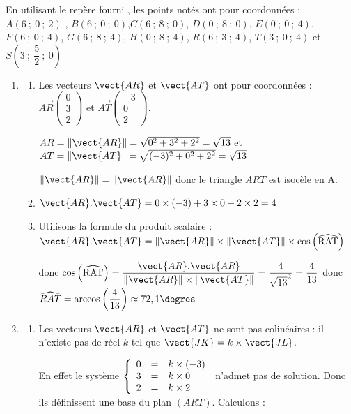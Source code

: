 \medskip
En utilisant le repère fourni \Oijk, les points notés ont pour coordonnées : 
$A\left(6~;~0~;~2\right)$ , $B\left(6~;~0~;~0\right)$,$C\left(6~;~8~;~0\right)$, $D\left(0~;~8~;~0\right)$, $E\left(0~;~0~;~4\right)$, $F\left(6~;~0~;~4\right)$, $G\left(6~;~8~;~4\right)$, $H\left(0~;~8~;~4\right)$, $R\left(6~;~3~;~4\right)$, $T\left(3~;~0~;~4\right)$ et $S\left(3~;~\dfrac52~;~0\right)$

\begin{enumerate}
	\item 
	\begin{enumerate}
		\item Les vecteurs $\vect{AR}$ et $\vect{AT}$ ont pour coordonnées : \(\overrightarrow{AR}\begin{pmatrix}0\\3\\2\end{pmatrix}\) et \(\overrightarrow{AT}\begin{pmatrix}-3\\0\\2\end{pmatrix}\).
		
		$AR=\lVert\vect{AR}\rVert=\sqrt{0^2+3^2+2^2}=\sqrt{13}$ et $AT=\lVert\vect{AT}\rVert=\sqrt{(-3)^2+0^2+2^2}=\sqrt{13}$
			
		$\lVert\vect{AR}\rVert=\lVert\vect{AR}\rVert$ donc le triangle $ART$ est isocèle en A.
		\item $\vect{AR}.\vect{AT}=0\times(-3)+3\times 0+2\times 2 = 4$
		\item Utilisons la formule du produit scalaire : $\vect{AR}.\vect{AT}= \left\|\vect{AR}\right\| \times \left\|\vect{AT}\right\| \times \cos \left(\widehat{\text{RAT}}\right)$ 
		
donc
		$\cos \left(\widehat{\text{RAT}}\right) = \dfrac{\vect{AR}.\vect{AR}}{\lVert\vect{AR}\rVert \times \lVert\vect{AT}\rVert}=\dfrac{4}{\sqrt{13}^2}=\dfrac{4}{13}$ donc $\widehat{RAT}=\arccos\left(\dfrac{4}{13}\right)\approx 72,1 \degres$
	\end{enumerate}
\item 
	\begin{enumerate}
		\item Les vecteurs $\vect{AR}$ et $\vect{AT}$ ne sont pas colinéaires : il n'existe pas de réel $k$ tel que $\vect{JK}=k\times \vect{JL}$.
		
		En effet le système $\left\{\begin{array}{l c l} 0&=&k\times (-3)\\3 &=& k\times 0\\2&=& k\times 2 \end{array}\right.$ n'admet pas de solution.
		Donc ils définissent une base du plan $(ART)$.
		Calculons :
		

\end{enumerate}
\end{enumerate}
